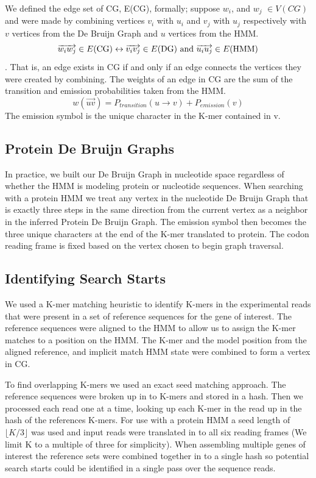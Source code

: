 \documentclass[10pt]{bmc_article}
\newenvironment{bmcformat}{\begin{raggedright}\baselineskip20pt\sloppy\setboolean{publ}{false}}{\end{raggedright}\baselineskip20pt\sloppy}
\begin{document}
\begin{bmcformat}
We defined the edge set of CG, E(CG), formally; suppose $w_i$, and $w_j$ \(\in V(CG) \) and were made by combining vertices $v_i$ with $u_i$ and $v_j$ with $u_j$ respectively with $v$ vertices from the De Bruijn Graph and $u$ vertices from the HMM.
\[\overrightarrow{w_iw_j} \in E(\textnormal{CG}) \leftrightarrow \overrightarrow{v_iv_j} \in 
E(\textnormal{DG})\textnormal{ and } \overrightarrow{u_iu_j} \in E(\textnormal{HMM})\].
That is, an edge exists in CG if and only if an edge connects the vertices they were created by combining.
The weights of an edge  in CG are the sum of the transition and emission probabilities taken from the HMM.  
\[ w(\overrightarrow{uv}) = P_{transition}(u \rightarrow v) + P_{emission}(v) \]
The emission symbol is the unique character in the K-mer contained in v.

\subsection*{Protein De Bruijn Graphs}
In practice, we built our De Bruijn Graph in nucleotide space regardless of whether the HMM is modeling protein or nucleotide sequences.  When searching with a protein HMM we treat any vertex in the nucleotide De Bruijn Graph that is exactly three steps in the same direction from the current vertex as a neighbor in the inferred Protein De Bruijn Graph.  The emission symbol then becomes the three unique characters at the end of the K-mer translated to protein.  The codon reading frame is fixed based on the vertex chosen to begin graph traversal.

\subsection*{Identifying Search Starts}
We used a K-mer matching heuristic to identify K-mers in the experimental reads that were present in a set of reference sequences for the gene of interest.  The reference sequences were aligned to the HMM to allow us to assign the K-mer matches to a position on the HMM.  The K-mer and the model position from the aligned reference, and implicit match HMM state were combined to form a vertex in CG.

To find overlapping K-mers we used an exact seed matching approach. The reference sequences were broken up in to K-mers and stored in a hash. Then we processed each read one at a time, looking up each K-mer in the read up in the hash of the references K-mers.  For use with a protein HMM a seed length of $\lfloor K/3\rfloor$ was used and input reads were translated in to all six reading frames (We limit K to a multiple of three for simplicity). When assembling multiple genes of interest the reference sets were combined together in to a single hash so potential search starts could be identified in a single pass over the sequence reads.


\end{bmcformat}
\end{document}

